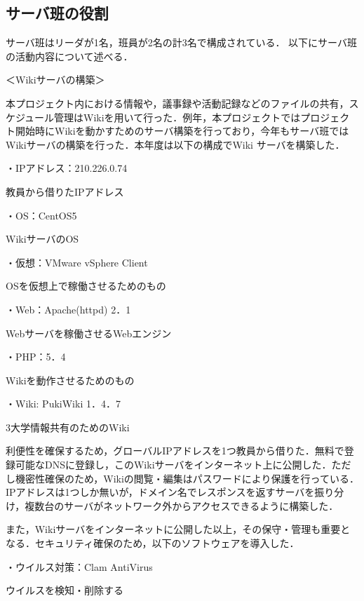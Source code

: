 \subsection{サーバ班の役割}
\par サーバ班はリーダが1名，班員が2名の計3名で構成されている．
以下にサーバ班の活動内容について述べる．
\par ＜Wikiサーバの構築＞
\par
本プロジェクト内における情報や，議事録や活動記録などのファイルの共有，スケジュール管理はWikiを用いて行った．例年，本プロジェクトではプロジェクト開始時にWikiを動かすためのサーバ構築を行っており，今年もサーバ班ではWikiサーバの構築を行った．本年度は以下の構成でWiki サーバを構築した．
\par
\par ・IPアドレス：210.226.0.74
\par 教員から借りたIPアドレス
\par
\par ・OS：CentOS5
\par WikiサーバのOS
\par 
\par ・仮想：VMware vSphere Client
\par OSを仮想上で稼働させるためのもの
\par 
\par ・Web：Apache(httpd) 2．1
\par Webサーバを稼働させるWebエンジン
\par 
\par ・PHP：5．4
\par Wikiを動作させるためのもの
\par 
\par ・Wiki: PukiWiki 1．4．7
\par 3大学情報共有のためのWiki
\par
\par
利便性を確保するため，グローバルIPアドレスを1つ教員から借りた．無料で登録可能なDNSに登録し，このWikiサーバをインターネット上に公開した．ただし機密性確保のため，Wikiの閲覧・編集はパスワードにより保護を行っている．IPアドレスは1つしか無いが，ドメイン名でレスポンスを返すサーバを振り分け，複数台のサーバがネットワーク外からアクセスできるように構築した．
\par
また，Wikiサーバをインターネットに公開した以上，その保守・管理も重要となる．セキュリティ確保のため，以下のソフトウェアを導入した．
\par
\par ・ウイルス対策：Clam AntiVirus
\par ウイルスを検知・削除する
